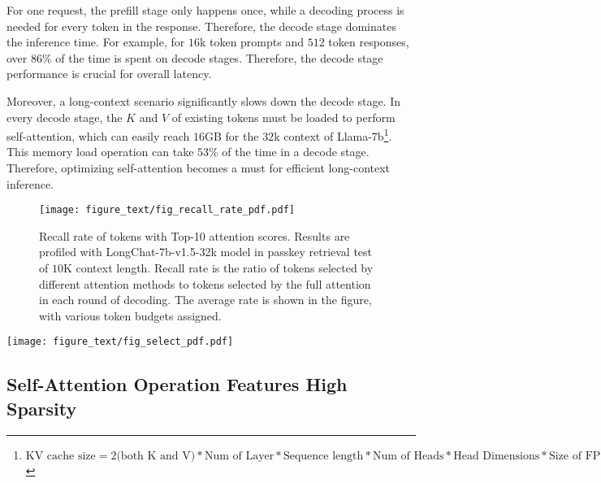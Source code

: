 For one request, the prefill stage only happens once, while a decoding process is needed for every token in the response. Therefore, the decode stage dominates the inference time. For example, for $16$k token prompts and $512$ token responses, over $86$\% of the time is spent on decode stages. Therefore, the decode stage performance is crucial for overall latency.

Moreover, a long-context scenario significantly slows down the decode stage. In every decode stage, the $K$ and $V$ of existing tokens must be loaded to perform self-attention, which can easily reach $16$GB for the $32$k context of Llama-7b\footnote{$\text{KV cache size} = 2 \text{\xspace(both K and V)} * \text{Num of Layer} * \text{Sequence length} * \text{Num of Heads} * \text{Head Dimensions} * \text{Size of FP16} = 2 * 32 * 32 * 32 * 128 * 2 =  16 \text{GB}$}. This memory load operation can take $53$\% of the time in a decode stage. Therefore, optimizing self-attention becomes a must for efficient long-context inference.
\begin{figure}[t]
    \centering
     \texttt{[image: figure\_text/fig\_recall\_rate\_pdf.pdf]}
    \caption{Recall rate of tokens with Top-10 attention scores. Results are profiled with LongChat-7b-v1.5-32k model in passkey retrieval test of $10$K context length. Recall rate is the ratio of tokens selected by different attention methods to tokens selected by the full attention in each round of decoding. The average rate is shown in the figure, with various token budgets assigned.}
    \label{fig:recall}
    \vspace{-0.08in}
\end{figure}
\begin{figure*}[h]
    \centering
     \texttt{[image: figure\_text/fig\_select\_pdf.pdf]}
    \caption{\method performs self-attention in two stages. In stage 1, \method estimates the criticality of pages by performing element-wise product between the current Query vector and both Min Key and Max Key vectors in each KV cache page. \method gets the sum of the per-channel maximal value for each page as the page criticality estimation. In stage 2, only Top-K KV cache pages are loaded to perform sparse self-attention with the current Query. }
    \label{fig:select}
\end{figure*}
\subsection{Self-Attention Operation Features High Sparsity}

